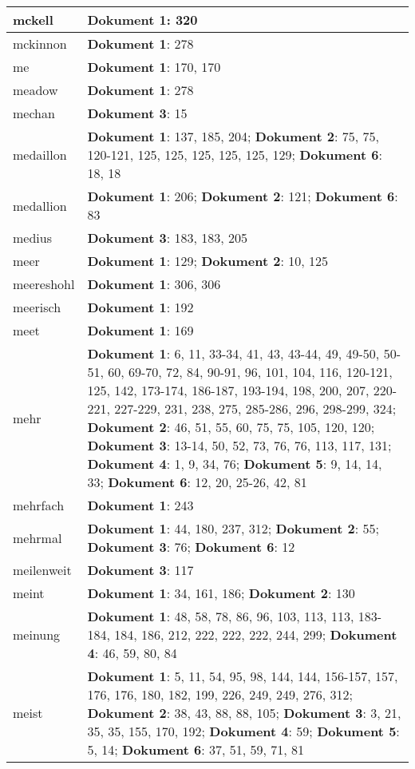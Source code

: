 \documentclass[a5paper]{article}
\begin{document}
\begin{longtable}[l]{|l|p{3in}|}
\hline
mckell & \textbf{Dokument 1}: 320 \\
\hline
mckinnon & \textbf{Dokument 1}: 278 \\
\hline
me & \textbf{Dokument 1}: 170, 170 \\
\hline
meadow & \textbf{Dokument 1}: 278 \\
\hline
mechan & \textbf{Dokument 3}: 15 \\
\hline
medaillon & \textbf{Dokument 1}: 137, 185, 204; \textbf{Dokument 2}: 75, 75, 120-121, 125, 125, 125, 125, 125, 129; \textbf{Dokument 6}: 18, 18 \\
\hline
medallion & \textbf{Dokument 1}: 206; \textbf{Dokument 2}: 121; \textbf{Dokument 6}: 83 \\
\hline
medius & \textbf{Dokument 3}: 183, 183, 205 \\
\hline
meer & \textbf{Dokument 1}: 129; \textbf{Dokument 2}: 10, 125 \\
\hline
meereshohl & \textbf{Dokument 1}: 306, 306 \\
\hline
meerisch & \textbf{Dokument 1}: 192 \\
\hline
meet & \textbf{Dokument 1}: 169 \\
\hline
mehr & \textbf{Dokument 1}: 6, 11, 33-34, 41, 43, 43-44, 49, 49-50, 50-51, 60, 69-70, 72, 84, 90-91, 96, 101, 104, 116, 120-121, 125, 142, 173-174, 186-187, 193-194, 198, 200, 207, 220-221, 227-229, 231, 238, 275, 285-286, 296, 298-299, 324; \textbf{Dokument 2}: 46, 51, 55, 60, 75, 75, 105, 120, 120; \textbf{Dokument 3}: 13-14, 50, 52, 73, 76, 76, 113, 117, 131; \textbf{Dokument 4}: 1, 9, 34, 76; \textbf{Dokument 5}: 9, 14, 14, 33; \textbf{Dokument 6}: 12, 20, 25-26, 42, 81 \\
\hline
mehrfach & \textbf{Dokument 1}: 243 \\
\hline
mehrmal & \textbf{Dokument 1}: 44, 180, 237, 312; \textbf{Dokument 2}: 55; \textbf{Dokument 3}: 76; \textbf{Dokument 6}: 12 \\
\hline
meilenweit & \textbf{Dokument 3}: 117 \\
\hline
meint & \textbf{Dokument 1}: 34, 161, 186; \textbf{Dokument 2}: 130 \\
\hline
meinung & \textbf{Dokument 1}: 48, 58, 78, 86, 96, 103, 113, 113, 183-184, 184, 186, 212, 222, 222, 222, 244, 299; \textbf{Dokument 4}: 46, 59, 80, 84 \\
\hline
meist & \textbf{Dokument 1}: 5, 11, 54, 95, 98, 144, 144, 156-157, 157, 176, 176, 180, 182, 199, 226, 249, 249, 276, 312; \textbf{Dokument 2}: 38, 43, 88, 88, 105; \textbf{Dokument 3}: 3, 21, 35, 35, 155, 170, 192; \textbf{Dokument 4}: 59; \textbf{Dokument 5}: 5, 14; \textbf{Dokument 6}: 37, 51, 59, 71, 81 \\

\end{longtable}
\end{document}
